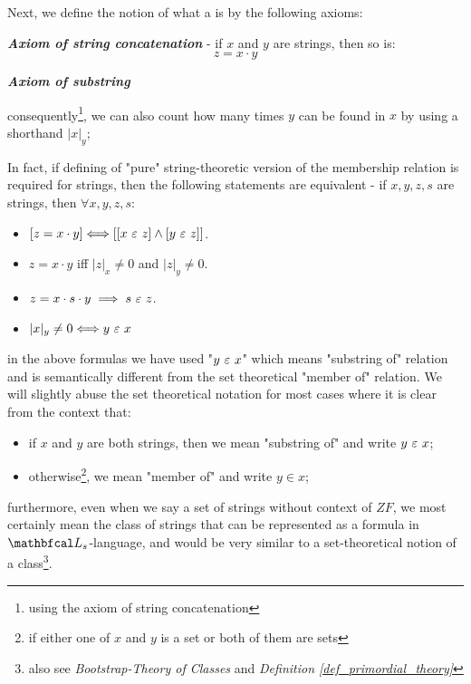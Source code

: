 \begin{definition}
  Next, we define the notion of what a  is by the following axioms:
  \begin{legal}
    \item \textbf{\textit{Axiom of string concatenation}} - if $x$ and $y$ are strings, then so is: 
     \[ z = x \cdot y \]
    \item \textbf{\textit{Axiom of substring}}
    \begin{legal}
      \item consequently\footnote{using the axiom of string concatenation}, we can also count how many times $y$ can be found in $x$ by using a shorthand $|x|_y$;
      \item In fact, if defining of "pure" string-theoretic version of the membership relation is required for strings, then the following statements are equivalent - if $x,y,z,s$ are strings, then $\forall x,y,z,s$:
        \begin{itemize}
          \item $[z = x \cdot y] \Longleftrightarrow [[x \ \varepsilon\  z] \land [y \ \varepsilon\  z]]$.
          \item $z = x \cdot y$ iff $|z|_x \neq 0$ and $|z|_y \neq 0$.
          \item $z = x \cdot s \cdot y \implies s \ \varepsilon\  z$.
          \item $|x|_y \neq 0 \Longleftrightarrow y \ \varepsilon\  x$
        \end{itemize}
      \item in the above formulas we have used "$y \ \varepsilon\  x$" which means "substring of" relation and is semantically different from the set theoretical "member of" relation. We will slightly abuse the set theoretical notation for most cases where it is clear from the context that:
        \begin{itemize}
          \item if $x$ and $y$ are both strings, then we mean "substring of" and write $y \ \varepsilon\  x$;
          \item otherwise\footnote{if either one of $x$ and $y$ is a set or both of them are sets}, we mean "member of" and write $y \in x$;
        \end{itemize}
      \item furthermore, even when we say a set of strings without context of $ZF$, we most certainly mean the class of strings that can be represented as a formula in $\lsign_{s}$-language, and would be very similar to a set-theoretical notion of a class\footnote{also see \textit{Bootstrap-Theory of Classes} and \textit{Definition \ref{def_primordial_theory}}}.

\end{legal}
\end{legal}
\end{definition}
